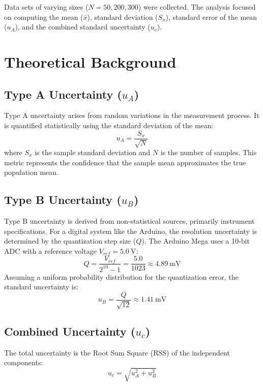 \documentclass[11pt]{article}
\begin{document}
Data sets of varying sizes ($N=50, 200, 300$) were collected. The analysis focused on computing the mean ($\bar{x}$), standard deviation ($S_x$), standard error of the mean ($u_A$), and the combined standard uncertainty ($u_c$).

\section{Theoretical Background}
\subsection{Type A Uncertainty ($u_A$)}
Type A uncertainty arises from random variations in the measurement process. It is quantified statistically using the standard deviation of the mean:
\begin{equation}
  u_A = \frac{S_x}{\sqrt{N}}
\end{equation}
where $S_x$ is the sample standard deviation and $N$ is the number of samples. This metric represents the confidence that the sample mean approximates the true population mean.

\subsection{Type B Uncertainty ($u_B$)}
Type B uncertainty is derived from non-statistical sources, primarily instrument specifications. For a digital system like the Arduino, the resolution uncertainty is determined by the quantization step size ($Q$). The Arduino Mega uses a 10-bit ADC with a reference voltage $V_{ref} = \SI{5.0}{\volt}$:
\begin{equation}
  Q = \frac{V_{ref}}{2^{10}-1} = \frac{5.0}{1023} \approx \SI{4.89}{\milli\volt}
\end{equation}
Assuming a uniform probability distribution for the quantization error, the standard uncertainty is:
\begin{equation}
  u_B = \frac{Q}{\sqrt{12}} \approx \SI{1.41}{\milli\volt}
\end{equation}

\subsection{Combined Uncertainty ($u_c$)}
The total uncertainty is the Root Sum Square (RSS) of the independent components:
\begin{equation}
  u_c = \sqrt{u_A^2 + u_B^2}
\end{equation}
\end{document}
